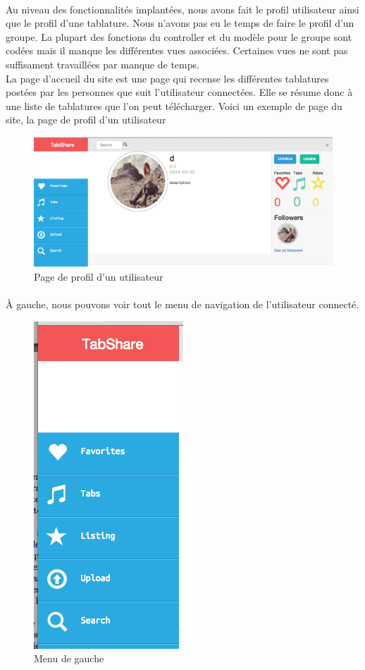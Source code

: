\paragraph{}
Au niveau des fonctionnalités implantées, nous avons fait le profil utilisateur ainsi que le profil d'une tablature. Nous n'avons pas eu le temps de faire le profil d'un groupe. La plupart des fonctions du controller et du modèle pour le groupe sont codées mais il manque les différentes vues associées. Certaines vues ne sont pas suffisament travaillées par manque de temps. \\
La page d'accueil du site est une page qui recense les différentes tablatures postées par les personnes que suit l'utilisateur connectées.
Elle se résume donc à une liste de tablatures que l'on peut télécharger.
Voici un exemple de page du site, la page de profil d'un utilisateur

\begin{figure}[H]
\centering
\includegraphics[scale=0.3]{profilUserWeb}
\caption{Page de profil d'un utilisateur}
\end{figure}

\paragraph{}
À gauche, nous pouvons voir tout le menu de navigation de l'utilisateur connecté.

\begin{figure}[H]
\centering
\includegraphics[scale=0.5]{leftWeb}
\caption{Menu de gauche}
\end{figure}

